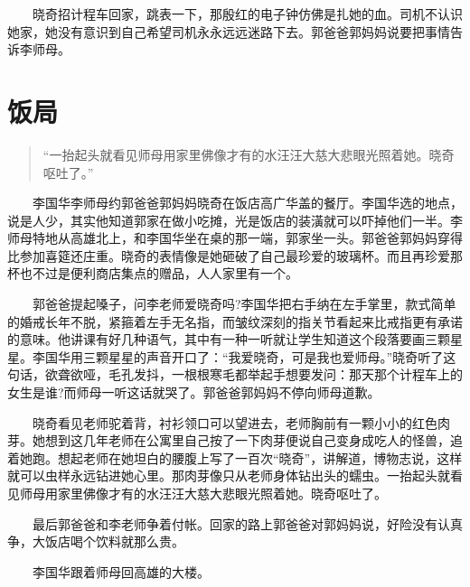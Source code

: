\documentclass[12pt,UTF8]{ctexbook}
\begin{document}
　　晓奇招计程车回家，跳表一下，那殷红的电子钟仿佛是扎她的血。司机不认识她家，她没有意识到自己希望司机永永远远迷路下去。郭爸爸郭妈妈说要把事情告诉李师母。

\hypertarget{ux996dux5c40}{%
\section*{饭局}\label{ux996dux5c40}}

\begin{quote}
\enquote{一抬起头就看见师母用家里佛像才有的水汪汪大慈大悲眼光照着她。晓奇呕吐了。}
\end{quote}

　　李国华李师母约郭爸爸郭妈妈晓奇在饭店高广华盖的餐厅。李国华选的地点，说是人少，其实他知道郭家在做小吃摊，光是饭店的装潢就可以吓掉他们一半。李师母特地从高雄北上，和李国华坐在桌的那一端，郭家坐一头。郭爸爸郭妈妈穿得比参加喜筵还庄重。晓奇的表情像是她砸破了自己最珍爱的玻璃杯。而且再珍爱那杯也不过是便利商店集点的赠品，人人家里有一个。

　　郭爸爸提起嗓子，问李老师爱晓奇吗?李国华把右手纳在左手掌里，款式简单的婚戒长年不脱，紧箍着左手无名指，而皱纹深刻的指关节看起来比戒指更有承诺的意味。他讲课有好几种语气，其中有一种一听就让学生知道这个段落要画三颗星星。李国华用三颗星星的声音开口了：\enquote{我爱晓奇，可是我也爱师母。}晓奇听了这句话，欲聋欲哑，毛孔发抖，一根根寒毛都举起手想要发问：那天那个计程车上的女生是谁?而师母一听这话就哭了。郭爸爸郭妈妈不停向师母道歉。

　　晓奇看见老师驼着背，衬衫领口可以望进去，老师胸前有一颗小小的红色肉芽。她想到这几年老师在公寓里自己按了一下肉芽便说自己变身成吃人的怪兽，追着她跑。想起老师在她坦白的腰腹上写了一百次\enquote{晓奇}，讲解道，博物志说，这样就可以虫样永远钻进她心里。那肉芽像只从老师身体钻出头的蠕虫。一抬起头就看见师母用家里佛像才有的水汪汪大慈大悲眼光照着她。晓奇呕吐了。

　　最后郭爸爸和李老师争着付帐。回家的路上郭爸爸对郭妈妈说，好险没有认真争，大饭店喝个饮料就那么贵。

　　李国华跟着师母回高雄的大楼。
\end{document}
